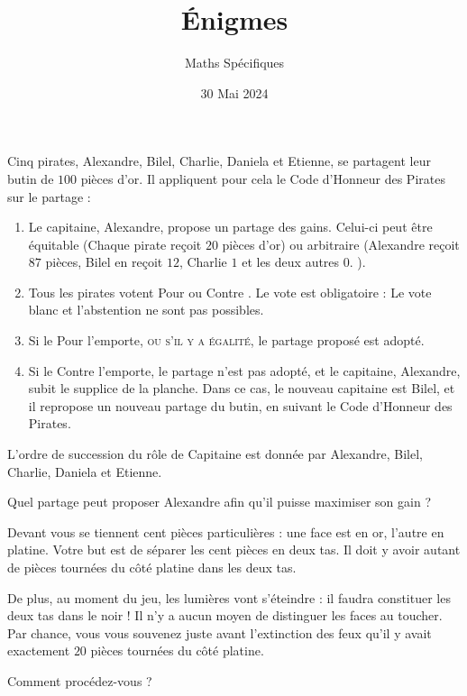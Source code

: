 \documentclass{exam}
\title{Énigmes}
\date{30 Mai 2024}
\author{Maths Spécifiques}
\begin{document}
\maketitle
\begin{questions}
Cinq pirates, Alexandre, Bilel, Charlie, Daniela et Etienne, se partagent leur butin de $100$ pièces d'or. Il appliquent pour cela le Code d'Honneur des Pirates sur le partage :
\begin{enumerate}
\item Le capitaine, Alexandre, propose un partage des gains. Celui-ci peut être équitable (\og Chaque pirate reçoit $20$ pièces d'or\fg) ou arbitraire (\og Alexandre reçoit $87$ pièces, Bilel en reçoit $12$, Charlie $1$ et les deux autres $0$. \fg).
\item Tous les pirates votent \og Pour \fg ou \og Contre \fg. Le vote est obligatoire : Le vote blanc et l'abstention ne sont pas possibles.
\item  Si le \og Pour \fg l'emporte, \textsc{ou s'il y a égalité}, le partage proposé est adopté.
\item Si le \og Contre \fg l'emporte, le partage n'est pas adopté, et le capitaine, Alexandre, subit le supplice de la planche. Dans ce cas, le nouveau capitaine est Bilel, et il repropose un nouveau partage du butin, en suivant le Code d'Honneur des Pirates.
\end{enumerate}
L'ordre de succession du rôle de Capitaine est donnée par Alexandre, Bilel, Charlie, Daniela et Etienne.

Quel partage peut proposer Alexandre afin qu'il puisse maximiser son gain ?


Devant vous se tiennent cent pièces particulières : une face est en or, l'autre en platine. Votre but est de séparer les cent pièces en deux tas. Il doit y avoir autant de pièces tournées du côté platine dans les deux tas. 

De plus, au moment du jeu, les lumières vont s'éteindre : il faudra constituer les deux tas dans le noir ! Il n'y a aucun moyen de distinguer les faces au toucher. Par chance, vous vous souvenez juste avant l'extinction des feux qu'il y avait exactement $20$ pièces tournées du côté platine.

Comment procédez-vous ?

\end{questions}
\end{document}
